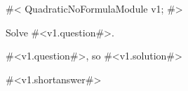 

#<
QuadraticNoFormulaModule v1;
#>

Solve #<v1.question#>.


#<v1.question#>,  so
#<v1.solution#>


#<v1.shortanswer#>


